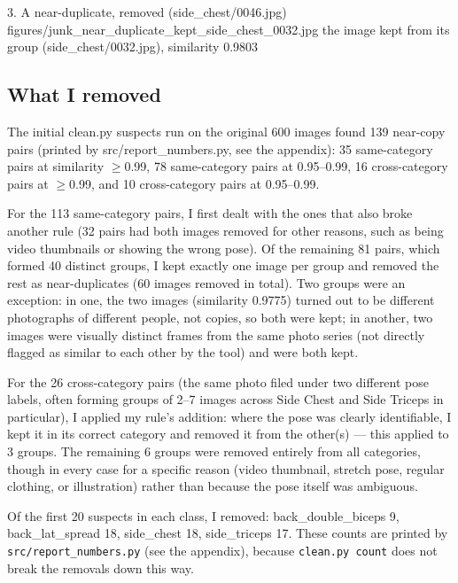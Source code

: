 \documentclass[11pt]{article}
\begin{document}
           {3. A near-duplicate, removed (side\_chest/0046.jpg)}
           {figures/junk_near_duplicate_kept_side_chest_0032.jpg}
           {the image kept from its group (side\_chest/0032.jpg), similarity 0.9803}

\subsection*{What I removed}

The initial clean.py suspects run on the original 600 images found 139 near-copy pairs (printed by src/report\_numbers.py, see the appendix): 35 same-category pairs at similarity $\geq$0.99, 78 same-category pairs at 0.95–0.99, 16 cross-category pairs at $\geq$0.99, and 10 cross-category pairs at 0.95–0.99.

For the 113 same-category pairs, I first dealt with the ones that also broke another rule (32 pairs had both images removed for other reasons, such as being video thumbnails or showing the wrong pose). Of the remaining 81 pairs, which formed 40 distinct groups, I kept exactly one image per group and removed the rest as near-duplicates (60 images removed in total). Two groups were an exception: in one, the two images (similarity 0.9775) turned out to be different photographs of different people, not copies, so both were kept; in another, two images were visually distinct frames from the same photo series (not directly flagged as similar to each other by the tool) and were both kept.

For the 26 cross-category pairs (the same photo filed under two different pose labels, often forming groups of 2–7 images across Side Chest and Side Triceps in particular), I applied my rule's addition: where the pose was clearly identifiable, I kept it in its correct category and removed it from the other(s) — this applied to 3 groups. The remaining 6 groups were removed entirely from all categories, though in every case for a specific reason (video thumbnail, stretch pose, regular clothing, or illustration) rather than because the pose itself was ambiguous.

Of the first 20 suspects in each class, I removed: back\_double\_biceps 9,
back\_lat\_spread 18, side\_chest 18, side\_triceps 17. These counts are
printed by \texttt{src/report\_numbers.py} (see the appendix), because
\texttt{clean.py count} does not break the removals down this way.
\end{document}

